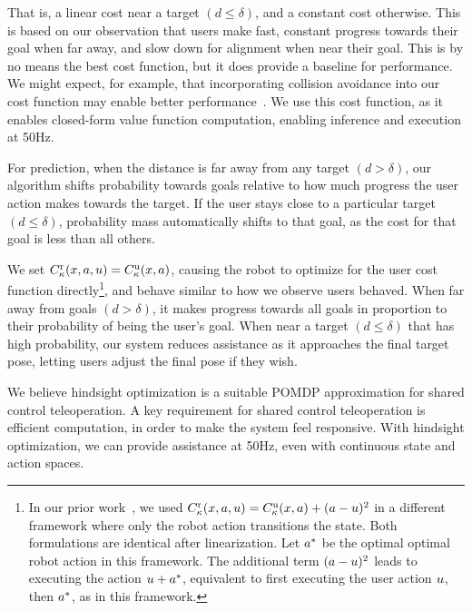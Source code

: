 That is, a linear cost near a target $(d \leq \delta)$, and a constant cost otherwise. This is based on our observation that users make fast, constant progress towards their goal when far away, and slow down for alignment when near their goal. This is by no means the best cost function, but it does provide a baseline for performance. We might expect, for example, that incorporating collision avoidance into our cost function may enable better performance~\citep{you_2011}. We use this cost function, as it enables closed-form value function computation, enabling inference and execution at 50Hz.

For prediction, when the distance is far away from any target $(d > \delta)$, our algorithm shifts probability towards goals relative to how much progress the user action makes towards the target. If the user stays close to a particular target $(d \leq \delta)$, probability mass automatically shifts to that goal, as the cost for that goal is less than all others.

We set $C_{\kappa}^{\text{r}}(x, a, u) = C_{\kappa}^{\text{u}}(x, a)$, causing the robot to optimize for the user cost function directly\footnote{In our prior work~\citep{javdani_2015_rss}, we used $C_{\kappa}^{\text{r}}(x, a, u) = C_{\kappa}^{\text{u}}(x, a) + (a - u)^2$ in a different framework where only the robot action transitions the state. Both formulations are identical after linearization. Let $a^*$ be the optimal optimal robot action in this framework. The additional term $(a - u)^2$ leads to executing the action $u + a^*$, equivalent to first executing the user action $u$, then $a^*$, as in this framework.}, and behave similar to how we observe users behaved. When far away from goals $(d > \delta)$, it makes progress towards all goals in proportion to their probability of being the user's goal. When near a target $(d \leq \delta)$ that has high probability, our system reduces assistance as it approaches the final target pose, letting users adjust the final pose if they wish.


We believe hindsight optimization is a suitable POMDP approximation for shared control teleoperation. A key requirement for shared control teleoperation is efficient computation, in order to make the system feel responsive. With hindsight optimization, we can provide assistance at 50Hz, even with continuous state and action spaces.

